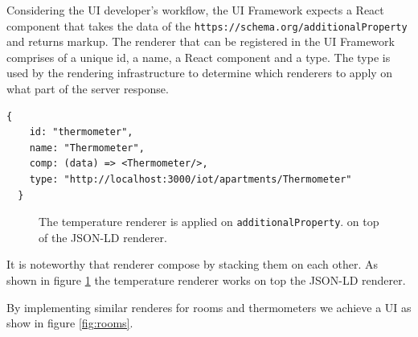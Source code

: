 Considering the UI developer's workflow, the UI Framework expects a React component that takes the data of the \lstinline{https://schema.org/additionalProperty} and returns markup. The renderer that can be registered in the UI Framework comprises of a unique id, a name, a React component and a type. The type is used by the rendering infrastructure to determine which renderers to apply on what part of the server response.

\lstset{language=JSON}
\begin{lstlisting}[caption=Renderer configuration that the developer provides.]
  {
    id: "thermometer",
    name: "Thermometer",
    comp: (data) => <Thermometer/>,
    type: "http://localhost:3000/iot/apartments/Thermometer"
  }
\end{lstlisting}

\begin{figure}[!htb]
  \caption{The temperature renderer is applied on \lstinline{additionalProperty}. on top of the JSON-LD renderer.}
  \label{fig:temperature}
\end{figure}

It is noteworthy that renderer compose by stacking them on each other. As shown in figure \ref{fig:temperature} the temperature renderer works on top the JSON-LD renderer.

By implementing similar renderes for rooms and thermometers we achieve a UI as show in figure \ref{fig:rooms}.

